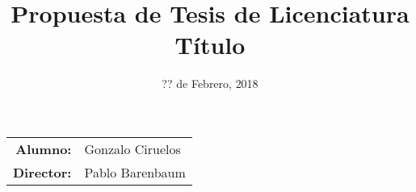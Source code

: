 \documentclass[11pt, a4paper]{article}
\title{Propuesta de Tesis de Licenciatura \\ Título}
\date{?? de Febrero, 2018}
\begin{document}
\maketitle
\begin{large}
\begin{tabular}{r l}
  \textbf{Alumno:} & Gonzalo Ciruelos \\
  \textbf{Director:} & Pablo Barenbaum \\
\end{tabular}
\end{large}




\end{document}

